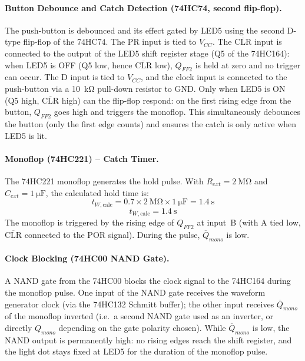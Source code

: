\documentclass[12pt, a4paper]{article}
\begin{document}
\paragraph{Button Debounce and Catch Detection (74HC74, second flip-flop).}
The push-button is debounced and its effect gated by LED5 using the second D-type
flip-flop of the 74HC74.
The $\overline{\text{PR}}$ input is tied to $V_{CC}$.
The $\overline{\text{CLR}}$ input is connected to the output of the LED5 shift
register stage (Q5 of the 74HC164): when LED5 is OFF (Q5 low, hence
$\overline{\text{CLR}}$ low), $Q_{FF2}$ is held at zero and no trigger can occur.
The D input is tied to $V_{CC}$, and the clock input is connected to the
push-button via a \SI{10}{\kilo\ohm} pull-down resistor to GND.
Only when LED5 is ON (Q5 high, $\overline{\text{CLR}}$ high) can the flip-flop
respond: on the first rising edge from the button, $Q_{FF2}$ goes high and
triggers the monoflop.
This simultaneously debounces the button (only the first edge counts) and ensures
the catch is only active when LED5 is lit.

\paragraph{Monoflop (74HC221) -- Catch Timer.}
The 74HC221 monoflop generates the hold pulse.
With $R_{ext} = \SI{2}{\mega\ohm}$ and $C_{ext} = \SI{1}{\micro\farad}$, the
calculated hold time is:
\begin{equation}
  t_{W,\text{calc}} = 0.7 \times \SI{2}{\mega\ohm} \times \SI{1}{\micro\farad}
  = \SI{1.4}{\second}
  \label{eq:monoflop_calc}
\end{equation}
\[
  \boxed{t_{W,\text{calc}} = \SI{1.4}{\second}}
\]
The monoflop is triggered by the rising edge of $Q_{FF2}$ at input~B (with A tied
low, $\overline{\text{CLR}}$ connected to the POR signal).
During the pulse, $\overline{Q}_{mono}$ is low.

\paragraph{Clock Blocking (74HC00 NAND Gate).}
A NAND gate from the 74HC00 blocks the clock signal to the 74HC164 during the
monoflop pulse.
One input of the NAND gate receives the waveform generator clock (via the 74HC132
Schmitt buffer); the other input receives $\overline{Q}_{mono}$ of the monoflop
inverted (i.e.\ a second NAND gate used as an inverter, or directly $Q_{mono}$
depending on the gate polarity chosen).
While $\overline{Q}_{mono}$ is low, the NAND output is permanently high: no rising
edges reach the shift register, and the light dot stays fixed at LED5 for the
duration of the monoflop pulse.
\end{document}
